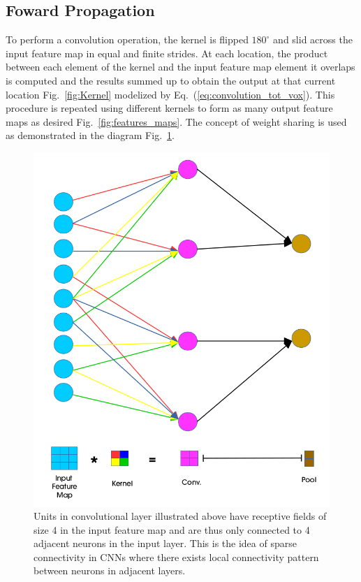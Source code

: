 \documentclass[final, paper=letter,5p,times,twocolumn]{elsarticle}
\begin{document}
\subsection{Foward Propagation}

To perform a convolution operation, the kernel is flipped $180^{\circ}$ and slid across the input feature map in equal and finite strides. At each location, the product between each element of the kernel and the input feature map element it overlaps is computed and the results summed up to obtain the output at that current location Fig.~\ref{fig:Kernel} modelized by Eq.~(\ref{eq:convolution_tot_vox}). This procedure is repeated using different kernels to form as many output feature maps as desired Fig.~\ref{fig:features_maps}. The concept of weight sharing is used as demonstrated in the diagram Fig.~\ref{fig:fCNN}.

\begin{figure}[htbp]
   \begin{center}
      \includegraphics[scale=0.3, angle=0]{images/fCNN.png}
   \end{center}
   \caption{Units in convolutional layer illustrated above have receptive fields of size 4 in the input feature map and are thus only connected to 4 adjacent neurons in the input layer. This is the idea of sparse connectivity in CNNs where there exists local connectivity pattern between neurons in adjacent layers.}
  \label{fig:fCNN} 
\end{figure}
\end{document}
